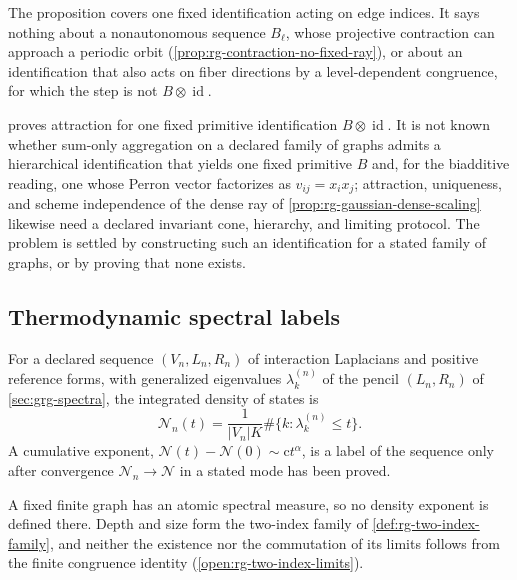 The proposition covers one fixed identification acting on edge indices. It
says nothing about a nonautonomous sequence \(B_\ell\), whose projective
contraction can approach a periodic orbit
(\cref{prop:rg-contraction-no-fixed-ray}), or about an identification that
also acts on fiber directions by a level-dependent congruence, for which the
step is not \(B\otimes\operatorname{id}\).

 proves attraction for one fixed primitive
identification \(B\otimes\operatorname{id}\). It is not known whether sum-only
aggregation on a declared family of graphs admits a hierarchical
identification that yields one fixed primitive \(B\) and, for the biadditive
reading, one whose Perron vector factorizes as \(v_{ij}=x_ix_j\); attraction,
uniqueness, and scheme independence of the dense ray of
\cref{prop:rg-gaussian-dense-scaling} likewise need a declared invariant cone,
hierarchy, and limiting protocol. The problem is settled by constructing such
an identification for a stated family of graphs, or by proving that none
exists.

\subsection{Thermodynamic spectral labels}

For a declared sequence \((V_n,L_n,R_n)\) of interaction Laplacians and
positive reference forms, with generalized eigenvalues \(\lambda^{(n)}_k\) of
the pencil \((L_n,R_n)\) of \cref{sec:grg-spectra}, the integrated density of
states is
\begin{equation}
\mathcal N_n(t)
=\frac{1}{\lvert V_n\rvert K}
\#\{k:\lambda_k^{(n)}\leq t\}.
\label{eq:grg-ids}
\end{equation}
A cumulative exponent, \(\mathcal N(t)-\mathcal N(0)\sim\mathrm ct^\alpha\), is a
label of the sequence only after convergence \(\mathcal N_n\to\mathcal N\) in a
stated mode has been proved.

A fixed finite graph has an atomic spectral measure, so no density exponent is
defined there. Depth and size form the two-index family of
\cref{def:rg-two-index-family}, and neither the existence nor the commutation
of its limits follows from the finite congruence identity
(\cref{open:rg-two-index-limits}).
